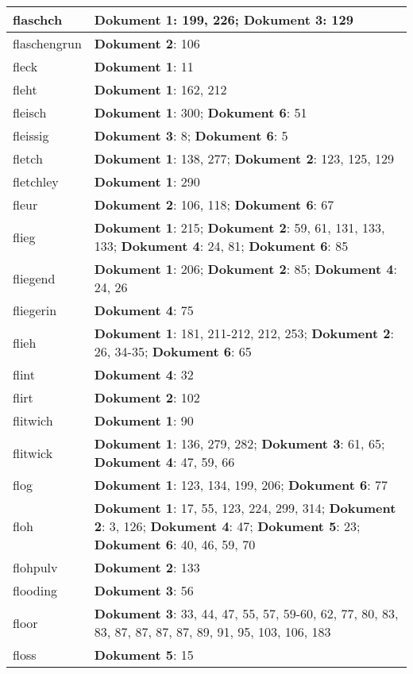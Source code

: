 \documentclass[a5paper]{article}
\begin{document}
\begin{longtable}[l]{|l|p{3in}|}
\hline
flaschch & \textbf{Dokument 1}: 199, 226; \textbf{Dokument 3}: 129 \\
\hline
flaschengrun & \textbf{Dokument 2}: 106 \\
\hline
fleck & \textbf{Dokument 1}: 11 \\
\hline
fleht & \textbf{Dokument 1}: 162, 212 \\
\hline
fleisch & \textbf{Dokument 1}: 300; \textbf{Dokument 6}: 51 \\
\hline
fleissig & \textbf{Dokument 3}: 8; \textbf{Dokument 6}: 5 \\
\hline
fletch & \textbf{Dokument 1}: 138, 277; \textbf{Dokument 2}: 123, 125, 129 \\
\hline
fletchley & \textbf{Dokument 1}: 290 \\
\hline
fleur & \textbf{Dokument 2}: 106, 118; \textbf{Dokument 6}: 67 \\
\hline
flieg & \textbf{Dokument 1}: 215; \textbf{Dokument 2}: 59, 61, 131, 133, 133; \textbf{Dokument 4}: 24, 81; \textbf{Dokument 6}: 85 \\
\hline
fliegend & \textbf{Dokument 1}: 206; \textbf{Dokument 2}: 85; \textbf{Dokument 4}: 24, 26 \\
\hline
fliegerin & \textbf{Dokument 4}: 75 \\
\hline
flieh & \textbf{Dokument 1}: 181, 211-212, 212, 253; \textbf{Dokument 2}: 26, 34-35; \textbf{Dokument 6}: 65 \\
\hline
flint & \textbf{Dokument 4}: 32 \\
\hline
flirt & \textbf{Dokument 2}: 102 \\
\hline
flitwich & \textbf{Dokument 1}: 90 \\
\hline
flitwick & \textbf{Dokument 1}: 136, 279, 282; \textbf{Dokument 3}: 61, 65; \textbf{Dokument 4}: 47, 59, 66 \\
\hline
flog & \textbf{Dokument 1}: 123, 134, 199, 206; \textbf{Dokument 6}: 77 \\
\hline
floh & \textbf{Dokument 1}: 17, 55, 123, 224, 299, 314; \textbf{Dokument 2}: 3, 126; \textbf{Dokument 4}: 47; \textbf{Dokument 5}: 23; \textbf{Dokument 6}: 40, 46, 59, 70 \\
\hline
flohpulv & \textbf{Dokument 2}: 133 \\
\hline
flooding & \textbf{Dokument 3}: 56 \\
\hline
floor & \textbf{Dokument 3}: 33, 44, 47, 55, 57, 59-60, 62, 77, 80, 83, 83, 87, 87, 87, 87, 89, 91, 95, 103, 106, 183 \\
\hline
floss & \textbf{Dokument 5}: 15 \\

\end{longtable}
\end{document}
